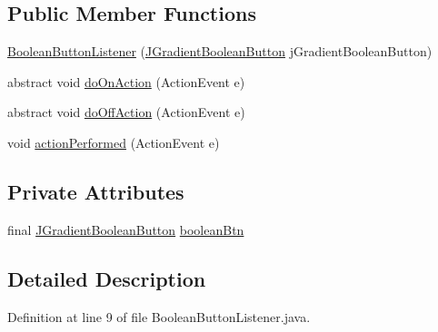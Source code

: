 \subsection*{Public Member Functions}
\begin{DoxyCompactItemize}
\item 
\hyperlink{classit_1_1emarolab_1_1cagg_1_1debugging_1_1baseComponents_1_1BooleanButtonListener_a80bb766899f34baa989ed6f22332f9e7}{Boolean\-Button\-Listener} (\hyperlink{classit_1_1emarolab_1_1cagg_1_1debugging_1_1baseComponents_1_1JGradientBooleanButton}{J\-Gradient\-Boolean\-Button} j\-Gradient\-Boolean\-Button)
\item 
abstract void \hyperlink{classit_1_1emarolab_1_1cagg_1_1debugging_1_1baseComponents_1_1BooleanButtonListener_a6328d08340b485b36bd4c97e46a42c45}{do\-On\-Action} (Action\-Event e)
\item 
abstract void \hyperlink{classit_1_1emarolab_1_1cagg_1_1debugging_1_1baseComponents_1_1BooleanButtonListener_a0dc6e838d710758d23441f4a7dd4d936}{do\-Off\-Action} (Action\-Event e)
\item 
void \hyperlink{classit_1_1emarolab_1_1cagg_1_1debugging_1_1baseComponents_1_1BooleanButtonListener_a11d98f807902b4eee20eeec0a1199e6d}{action\-Performed} (Action\-Event e)
\end{DoxyCompactItemize}
\subsection*{Private Attributes}
\begin{DoxyCompactItemize}
\item 
final \hyperlink{classit_1_1emarolab_1_1cagg_1_1debugging_1_1baseComponents_1_1JGradientBooleanButton}{J\-Gradient\-Boolean\-Button} \hyperlink{classit_1_1emarolab_1_1cagg_1_1debugging_1_1baseComponents_1_1BooleanButtonListener_a08f85bc0fb78b75738e88b37c51c72e0}{boolean\-Btn}
\end{DoxyCompactItemize}


\subsection{Detailed Description}


Definition at line 9 of file Boolean\-Button\-Listener.\-java.




